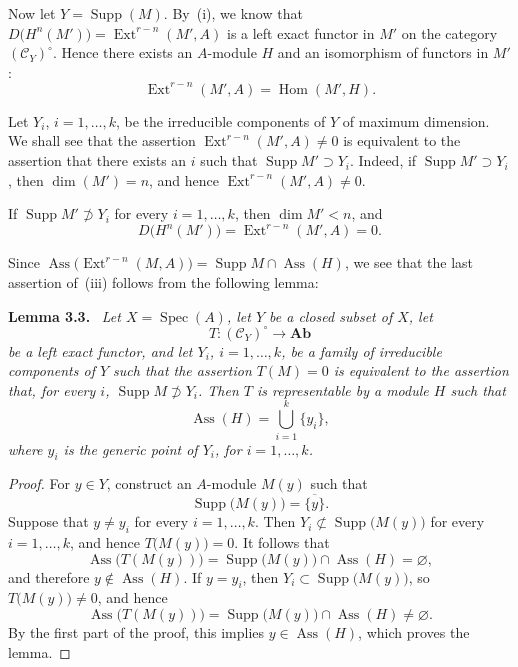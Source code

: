 \documentclass[11pt,a4paper,oneside]{book}
\providecommand{\srcpage}[1]{%
  \marginpar{\raggedright\scriptsize\color{gray}Original French p.~#1}}
\providecommand{\Ab}{\mathbf{Ab}}
\providecommand{\Assop}{\operatorname{Ass}}
\providecommand{\Suppop}{\operatorname{Supp}}
\providecommand{\Specop}{\operatorname{Spec}}
\providecommand{\Homop}{\operatorname{Hom}}
\providecommand{\Extop}{\operatorname{Ext}}
\newenvironment{sgalemma}[1]
  {\par\addvspace{0.8\baselineskip}\noindent\textbf{#1.}\ \itshape}
  {\par\addvspace{0.35\baselineskip}}
\theoremstyle{plain}
\theoremstyle{definition}
\theoremstyle{remark}
\begin{document}
\medskip
Now let $Y=\Suppop(M)$. By~\textup{(i)}, we know that
$D\bigl(H^n(M')\bigr)=\Extop^{r-n}(M',A)$ is a left exact functor in $M'$ on
the category $(\mathcal C_Y)^\circ$. Hence there exists an $A$-module $H$ and
an isomorphism of functors in $M'$:
\[
  \Extop^{r-n}(M',A)=\Homop(M',H).
\]

Let $Y_i$, $i=1,\ldots,k$, be the irreducible components of $Y$ of maximum
dimension. We shall see that the assertion
$\Extop^{r-n}(M',A)\neq 0$ is equivalent to the assertion that there exists an
$i$ such that $\Suppop M'\supset Y_i$. Indeed, if
$\Suppop M'\supset Y_i$, then $\dim(M')=n$, and hence
$\Extop^{r-n}(M',A)\neq 0$.

If $\Suppop M'\not\supset Y_i$ for every $i=1,\ldots,k$, then
$\dim M'<n$, and
\[
  D\bigl(H^n(M')\bigr)=\Extop^{r-n}(M',A)=0.
\]

Since
$\Assop\bigl(\Extop^{r-n}(M,A)\bigr)=\Suppop M\cap\Assop(H)$, we see that
the last assertion of~\textup{(iii)} follows from the following lemma:

\begin{sgalemma}{Lemma 3.3}
Let $X=\Specop(A)$, let $Y$ be a closed subset of $X$, let
\[
  T\colon(\mathcal C_Y)^\circ\longrightarrow\Ab
\]
be a left exact functor, and let $Y_i$, $i=1,\ldots,k$, be a family of
irreducible components of $Y$ such that the assertion $T(M)=0$ is equivalent
to the assertion that, for every $i$, $\Suppop M\not\supset Y_i$. Then $T$ is
representable by a module $H$ such that
\[
  \Assop(H)=\bigcup_{i=1}^k\{y_i\},
\]
where $y_i$ is the generic point of $Y_i$, for $i=1,\ldots,k$.
\end{sgalemma}

\begin{proof}
For $y\in Y$, construct\srcpage{70} an $A$-module $M(y)$ such that
\[
  \Suppop\bigl(M(y)\bigr)=\overline{\{y\}}.
\]
Suppose that $y\neq y_i$ for every $i=1,\ldots,k$. Then
$Y_i\not\subset\Suppop\bigl(M(y)\bigr)$ for every $i=1,\ldots,k$, and hence
$T\bigl(M(y)\bigr)=0$. It follows that
\[
  \Assop\bigl(T(M(y))\bigr)
  =\Suppop\bigl(M(y)\bigr)\cap\Assop(H)=\varnothing,
\]
and therefore $y\notin\Assop(H)$. If $y=y_i$, then
$Y_i\subset\Suppop\bigl(M(y)\bigr)$, so $T\bigl(M(y)\bigr)\neq0$, and hence
\[
  \Assop\bigl(T(M(y))\bigr)
  =\Suppop\bigl(M(y)\bigr)\cap\Assop(H)\neq\varnothing.
\]
By the first part of the proof, this implies $y\in\Assop(H)$, which proves
the lemma.\qedhere
\end{proof}
\end{document}
